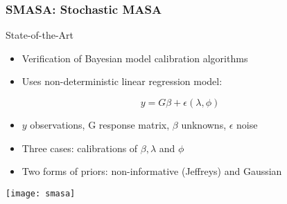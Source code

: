 \documentclass[mathserif]{beamer}
\begin{document}
\begin{frame}
  \frametitle{SMASA: Stochastic MASA}

  \begin{block}{State-of-the-Art}
    \begin{itemize} 
    \item Verification of Bayesian model calibration algorithms
    \item Uses non-deterministic linear regression model:
    \end{itemize}
    
    \begin{equation*}
        y = G \beta + \epsilon(\lambda,\phi)
    \end{equation*}
    
    \begin{itemize}
      \item $y$ observations, G response matrix, $\beta$ unknowns, $\epsilon$ noise 
      \item Three cases: calibrations of $\beta, \lambda$ and $\phi$
      \item Two forms of priors: non-informative (Jeffreys) and Gaussian
    \end{itemize}
  \end{block}


    \centering
    \texttt{[image: smasa]}

\end{frame}
\end{document}
